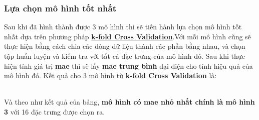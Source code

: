 \documentclass{report}
\begin{document}
    \subsubsection{Lựa chọn mô hình tốt nhất}
    Sau khi đã hình thành được 3 mô hình thì sẽ tiến hành lựa chọn mô hình tốt nhất dựa trên phương pháp \hyperref[sec:k-fold-cross-validation]{\textbf{k-fold Cross Validation}}.Với mỗi mô hình cũng sẽ thực hiện bằng cách chia các dòng dữ liệu thành các phần bằng nhau, và chọn tập huấn luyện và kiểm tra với tất cả đặc trưng của mô hình đó. Sau khi thực hiện tính giá trị \textbf{mae} thì sẽ lấy \textbf{mae trung bình} đại diện cho tính hiệu quả của mô hình đó. Kết quả cho 3 mô hình từ \textbf{k-fold Cross Validation} là: \\
\begin{table}[h]
    \centering
    \end{table}\\
    Và theo như kết quả của bảng, \textbf{mô hình có mae nhỏ nhất chính là mô hình 3} với 16 đặc trưng được chọn ra.\\
\end{document}
